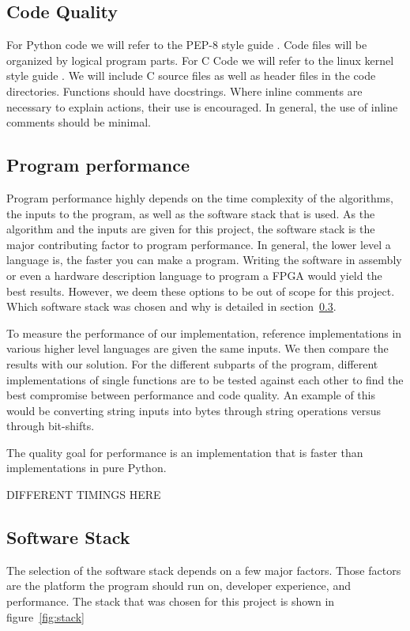\subsection{Code Quality}
\label{ch:codequality}
For Python code we will refer to the PEP-8 style guide \cite{pep8}. Code files will be organized by logical program parts. For C Code we will refer to the linux kernel style guide \cite{linuxkernel}. We will include C source files as well as header files in the code directories. Functions should have docstrings. Where inline comments are necessary to explain actions, their use is encouraged. In general, the use of inline comments should be minimal.

\subsection{Program performance}
\label{ch:programperformance}
Program performance highly depends on the time complexity of the algorithms, the inputs to the program, as well as the software stack that is used. As the algorithm and the inputs are given for this project, the software stack is the major contributing factor to program performance. In general, the lower level a language is, the faster you can make a program. Writing the software in assembly or even a hardware description language to program a \ac{FPGA} would yield the best results. However, we deem these options to be out of scope for this project. Which software stack was chosen and why is detailed in section~\ref{ch:softwarestack}.

To measure the performance of our implementation, reference implementations in various higher level languages are given the same inputs. We then compare the results with our solution. For the different subparts of the program, different implementations of single functions are to be tested against each other to find the best compromise between performance and code quality. An example of this would be converting string inputs into bytes through string operations versus through bit-shifts.

The quality goal for performance is an implementation that is faster than implementations in pure Python.

DIFFERENT TIMINGS HERE

\subsection{Software Stack}
\label{ch:softwarestack}
The selection of the software stack depends on a few major factors. Those factors are the platform the program should run on, developer experience, and performance. The stack that was chosen for this project is shown in figure~\ref{fig:stack}

